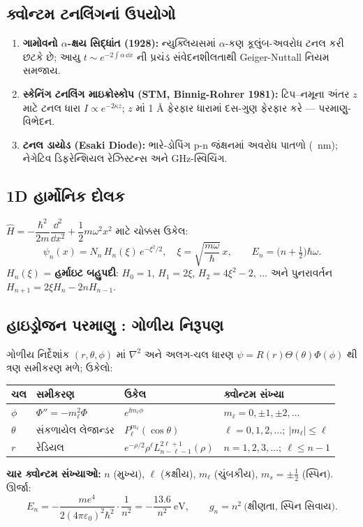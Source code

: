 \subsection{ક્વોન્ટમ ટનલિંગનાં ઉપયોગો}
\begin{enumerate}[label=(\alph*)]
  \item \textbf{ગામોવનો $\alpha$-ક્ષય સિદ્ધાંત (1928):} ન્યુક્લિયસમાં $\alpha$-કણ કૂલુંબ-અવરોધ ટનલ કરી છટકે છે; આયુ $t\sim e^{-2\int\alpha\,\dd x}$ ની પ્રચંડ સંવેદનશીલતાથી Geiger-Nuttall નિયમ સમજાય.
  \item \textbf{સ્કેનિંગ ટનલિંગ માઇક્રોસ્કોપ (STM, Binnig-Rohrer 1981):} ટિપ–નમૂના અંતર $z$ માટે ટનલ ધારા $I\propto e^{-2\kappa z}$; $z$ માં 1 Å ફેરફાર ધારામાં દસ-ગુણ ફેરફાર કરે — પરમાણુ-વિભેદન.
  \item \textbf{ટનલ ડાયોડ (Esaki Diode):} ભારે-ડોપિંગ p-n જંક્ષનમાં અવરોધ પાતળો (~nm); નેગેટિવ ડિફરેન્શિયલ રેઝિસ્ટન્સ અને GHz-સ્વિચિંગ.
\end{enumerate}

\subsection{1D હાર્મોનિક દોલક }
$\hat H=-\dfrac{\hbar^{2}}{2m}\dfrac{\dd^{2}}{\dd x^{2}}+\dfrac12m\omega^{2}x^{2}$ માટે ચોક્કસ ઉકેલ:
\begin{equation}
\psi_n(x)=N_n\,H_n(\xi)\,e^{-\xi^{2}/2},\quad \xi=\sqrt{\frac{m\omega}{\hbar}}\,x,
\qquad E_n=\Big(n+\tfrac12\Big)\hbar\omega .
\label{eq:hosc}
\end{equation}
$H_n(\xi)$ = \textbf{હર્માઇટ બહુપદી}: $H_0=1$, $H_1=2\xi$, $H_2=4\xi^{2}-2$, ... અને પુનરાવર્તન $H_{n+1}=2\xi H_n-2nH_{n-1}$.

\subsection{હાઇડ્રોજન પરમાણુ : ગોળીય નિરૂપણ }
ગોળીય નિર્દેશાંક $(r,\theta,\phi)$ માં $\nabla^{2}$ અને અલગ-ચલ ધારણ $\psi=R(r)\Theta(\theta)\Phi(\phi)$ થી ત્રણ સમીકરણ મળે; ઉકેલો:
\begin{center}
\begin{tabular}{@{}llll@{}}
\toprule
ચલ & સમીકરણ & ઉકેલ & ક્વોન્ટમ સંખ્યા \\
\midrule
$\phi$ & $\Phi''=-m_\ell^{2}\Phi$ & $e^{\ii m_\ell\phi}$ & $m_\ell=0,\pm1,\pm2,\dots$ \\
$\theta$ & સંકળાયેલ લેજાન્ડર & $P_\ell^{m_\ell}(\cos\theta)$ & $\ell=0,1,2,\dots;\ |m_\ell|\le\ell$ \\
$r$ & રેડિયલ & $e^{-\rho/2}\rho^\ell L_{n-\ell-1}^{2\ell+1}(\rho)$ & $n=1,2,3,\dots;\ \ell\le n-1$ \\
\bottomrule
\end{tabular}
\end{center}
\textbf{ચાર ક્વોન્ટમ સંખ્યાઓ:} $n$ (મુખ્ય), $\ell$ (કક્ષીય), $m_\ell$ (ચુંબકીય), $m_s=\pm\tfrac12$ (સ્પિન). ઊર્જા:
\begin{equation}
E_n=-\frac{me^{4}}{2(4\pi\varepsilon_0)^{2}\hbar^{2}}\cdot\frac{1}{n^{2}}=-\frac{13.6}{n^{2}}\ \mathrm{eV},
\qquad g_n=n^{2}\ \text{(ક્ષીણતા, સ્પિન સિવાય)}.
\label{eq:Henergy}
\end{equation}

